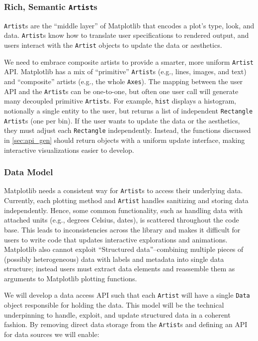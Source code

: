 \documentclass[11pt,letterpaper]{article}  %
\begin{document}
\subsubsection{Rich, Semantic \texttt{Artist}s}
\label{sec:artists}
\texttt{Artist}s are the ``middle layer'' of Matplotlib that encodes a plot's type, look, and data.  \texttt{Artist}s know how to translate user specifications to rendered output, and users interact with the \texttt{Artist} objects to update the data or aesthetics.

We need to embrace composite artists to provide a smarter, more uniform \texttt{Artist} API.
Matplotlib has a mix of ``primitive'' \texttt{Artist}s (e.g., lines, images, and text) and ``composite'' artists (e.g., the whole \texttt{Axes}). The mapping between the user API and the \texttt{Artist}s can be
one-to-one, but often one user call will generate many decoupled primitive \texttt{Artist}s.
For example, \texttt{hist} displays a histogram, notionally a single entity to the user,
but returns a list of independent \texttt{Rectangle} \texttt{Artist}s (one per bin).
If the user wants to update the data or the aesthetics, they must adjust each \texttt{Rectangle} independently.
Instead, the functions discussed in \ref{sec:api_gen} should return objects with
a uniform update interface, making interactive visualizations easier to develop.


\subsubsection{Data Model}
\label{sec:dm}
Matplotlib needs a consistent way for \texttt{Artist}s to access their underlying data. Currently, each plotting method and \texttt{Artist} handles sanitizing and storing data independently. Hence, some common functionality, such as handling data with attached units (e.g., degrees Celsius, dates), is scattered throughout the code base. This leads to inconsistencies across the library and makes it difficult for users to write code that updates interactive explorations and animations. Matplotlib also cannot exploit ``Structured data''--combining multiple pieces of (possibly heterogeneous) data with labels and metadata into single data structure; instead users must extract data elements and reassemble them as arguments to Matplotlib plotting functions.

We will develop a data access API such that each \texttt{Artist} will have a single \texttt{Data} object responsible for holding the data. This model will be the technical underpinning to handle, exploit, and
update structured data in a coherent fashion. By removing direct data storage from the \texttt{Artist}s and defining an API for data sources we will enable:
\end{document}
